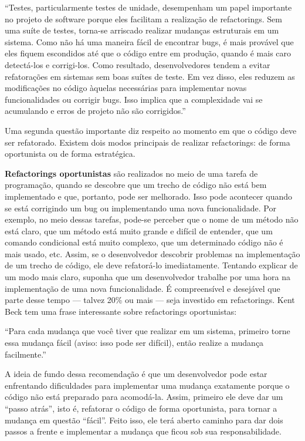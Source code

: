 \documentclass[
  11pt,
  twoside]{book}
\renewenvironment{quote}{\centering \vspace{1.5ex} \begin{tcolorbox}[colback=backcolor, width=4.9in]}{\end{tcolorbox}}
\begin{document}
\begin{quote}
``Testes, particularmente testes de unidade, desempenham um papel
importante no projeto de software porque eles facilitam a realização de
refactorings. Sem uma suíte de testes, torna-se arriscado realizar
mudanças estruturais em um sistema. Como não há uma maneira fácil de
encontrar bugs, é mais provável que eles fiquem escondidos até que o
código entre em produção, quando é mais caro detectá-los e corrigi-los.
Como resultado, desenvolvedores tendem a evitar refatorações em sistemas
sem boas suítes de teste. Em vez disso, eles reduzem as modificações no
código àquelas necessárias para implementar novas funcionalidades ou
corrigir bugs. Isso implica que a complexidade vai se acumulando e erros
de projeto não são corrigidos.''
\end{quote}

Uma segunda questão importante diz respeito ao momento em que o código
deve ser refatorado. Existem dois modos principais de realizar
refactorings: de forma oportunista ou de forma estratégica.

 \textbf{Refactorings oportunistas} são
realizados no meio de uma tarefa de programação, quando se descobre que
um trecho de código não está bem implementado e que, portanto, pode ser
melhorado. Isso pode acontecer quando se está corrigindo um bug ou
implementando uma nova funcionalidade. Por exemplo, no meio dessas
tarefas, pode-se perceber que o nome de um método não está claro, que um
método está muito grande e difícil de entender, que um comando
condicional está muito complexo, que um determinado código não é mais
usado, etc. Assim, se o desenvolvedor descobrir problemas na
implementação de um trecho de código, ele deve refatorá-lo
imediatamente. Tentando explicar de um modo mais claro, suponha que um
desenvolvedor trabalhe por uma hora na implementação de uma nova
funcionalidade. É compreensível e desejável que parte desse tempo ---
talvez 20\% ou mais --- seja investido em refactorings. Kent Beck tem
uma frase interessante sobre refactorings oportunistas:


\begin{quote}
``Para cada mudança que você tiver que realizar em um sistema, primeiro
torne essa mudança fácil (aviso: isso pode ser difícil), então realize a
mudança facilmente.''
\end{quote}

A ideia de fundo dessa recomendação é que um desenvolvedor pode estar
enfrentando dificuldades para implementar uma mudança exatamente porque
o código não está preparado para acomodá-la. Assim, primeiro ele deve
dar um ``passo atrás'', isto é, refatorar o código de forma oportunista,
para tornar a mudança em questão ``fácil''. Feito isso, ele terá aberto
caminho para dar dois passos a frente e implementar a mudança que ficou
sob sua responsabilidade.
\end{document}
